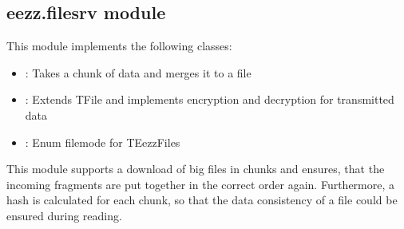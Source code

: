 \documentclass[letterpaper,10pt,english]{sphinxmanual}
\begin{document}
\subsection{eezz.filesrv module}
\label{\detokenize{eezz:module-eezz.filesrv}}\label{\detokenize{eezz:eezz-filesrv-module}}
\sphinxAtStartPar
This module implements the following classes:
\begin{itemize}
\item {} 
\sphinxAtStartPar
{}:        Takes a chunk of data and merges it to a file

\item {} 
\sphinxAtStartPar
{}:    Extends TFile and implements encryption and decryption for transmitted data

\item {} 
\sphinxAtStartPar
{}:    Enum file\sphinxhyphen{}mode for TEezzFiles

\end{itemize}

\sphinxAtStartPar
This module supports a download of big files in chunks and ensures, that the incoming fragments are
put together in the correct order again. Furthermore, a hash is calculated for each chunk, so that the
data consistency of a file could be ensured during reading.
\end{document}
